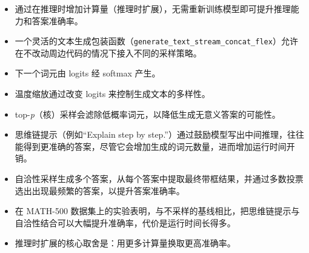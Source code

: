 \begin{itemize}
\item 通过在推理时增加计算量（推理时扩展），无需重新训练模型即可提升推理能力和答案准确率。
\item 一个灵活的文本生成包装函数（\texttt{generate\_text\_stream\_concat\_flex}）允许在不改动周边代码的情况下接入不同的采样策略。
\item 下一个词元由 logits 经 softmax 产生。
\item 温度缩放通过改变 logits 来控制生成文本的多样性。
\item top-\emph{p}（核）采样会滤除低概率词元，以降低生成无意义答案的可能性。
\item 思维链提示（例如“Explain step by step.”）通过鼓励模型写出中间推理，往往能得到更准确的答案，尽管它会增加生成的词元数量，进而增加运行时间开销。
\item 自洽性采样生成多个答案，从每个答案中提取最终带框结果，并通过多数投票选出出现最频繁的答案，以提升答案准确率。
\item 在 MATH-500 数据集上的实验表明，与不采样的基线相比，把思维链提示与自洽性结合可以大幅提升准确率，代价是运行时间长得多。
\item 推理时扩展的核心取舍是：用更多计算量换取更高准确率。
\end{itemize}
